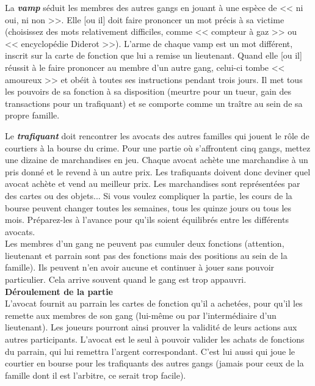 \documentclass[11pt,twoside,a4paper]{article}
\begin{document}
\begin{multicols*}{2}
La \textbf{\emph{vamp}} s{\'e}duit les membres des autres gangs en jouant {\`a} une esp{\`e}ce de << ni oui, ni non >>. Elle [ou il] doit faire prononcer un mot pr{\'e}cis {\`a} sa victime (choisissez des mots relativement difficiles, comme << compteur {\`a} gaz >> ou << encyclop{\'e}die Diderot >>). L'arme de chaque vamp est un mot diff{\'e}rent, inscrit sur la carte de fonction que lui a remise un lieutenant. Quand elle [ou il] r{\'e}ussit {\`a} le faire prononcer au membre d'un autre gang, celui-ci tombe << amoureux >> et ob{\'e}it {\`a} toutes ses instructions pendant trois jours. Il met tous les pouvoirs de sa fonction {\`a} sa disposition (meurtre pour un tueur, gain des transactions pour un trafiquant) et se comporte comme un tra{\^i}tre au sein de sa propre famille. ~\\

\vfill
\columnbreak

Le \textbf{\emph{trafiquant}} doit rencontrer les avocats des autres familles qui jouent le r{\^o}le de courtiers {\`a} la bourse du crime. Pour une partie o{\`u} s'affrontent cinq gangs, mettez une dizaine de marchandises en jeu. Chaque avocat ach{\`e}te une marchandise {\`a} un pris donn{\'e} et le revend {\`a} un autre prix. Les trafiquants doivent donc deviner quel avocat ach{\`e}te et vend au meilleur prix. Les marchandises sont repr{\'e}sent{\'e}es par des cartes ou des objets... Si vous voulez compliquer la partie, les cours de la bourse peuvent changer toutes les semaines, tous les quinze jours ou tous les mois. Pr{\'e}parez-les {\`a} l'avance pour qu'ils soient {\'e}quilibr{\'e}s entre les diff{\'e}rents avocats. ~\\

Les membres d'un gang ne peuvent pas cumuler deux fonctions (attention, lieutenant et parrain sont pas des fonctions mais des positions au sein de la famille). Ils peuvent n'en avoir aucune et continuer {\`a} jouer sans pouvoir particulier. Cela arrive souvent quand le gang est trop appauvri. ~\\

\textbf{\large D{\'e}roulement de la partie}~\\

L'avocat fournit au parrain les cartes de fonction qu'il a achet{\'e}es, pour qu'il les remette aux membres de son gang (lui-m{\^e}me ou par l'interm{\'e}diaire d'un lieutenant). Les joueurs pourront ainsi prouver la validit{\'e} de leurs actions aux autres participants. L'avocat est le seul {\`a} pouvoir valider les achats de fonctions du parrain, qui lui remettra l'argent correspondant. C'est lui aussi qui joue le courtier en bourse pour les trafiquants des autres gangs (jamais pour ceux de la famille dont il est l'arbitre, ce serait trop facile). ~\\


\end{multicols*}
\end{document}
